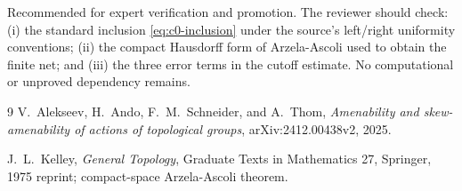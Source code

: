 \documentclass[11pt]{article}
\begin{document}
Recommended for expert verification and promotion.  The reviewer should
check: (i) the standard inclusion \eqref{eq:c0-inclusion} under the source's
left/right uniformity conventions; (ii) the compact Hausdorff form of
Arzela-Ascoli used to obtain the finite net; and (iii) the three error terms
in the cutoff estimate.  No computational or unproved dependency remains.

\begin{thebibliography}{9}
V.~Alekseev, H.~Ando, F.~M.~Schneider, and A.~Thom,
\emph{Amenability and skew-amenability of actions of topological groups},
arXiv:2412.00438v2, 2025.

J.~L.~Kelley,
\emph{General Topology},
Graduate Texts in Mathematics 27, Springer, 1975 reprint;
compact-space Arzela-Ascoli theorem.
\end{thebibliography}
\end{document}
